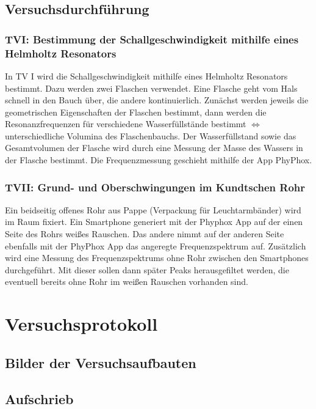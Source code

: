\documentclass{report}
\begin{document}
\subsection{Versuchsdurchführung}
\subsubsection{TVI: Bestimmung der Schallgeschwindigkeit mithilfe eines Helmholtz Resonators}
In TV I wird die Schallgeschwindigkeit mithilfe eines Helmholtz Resonators bestimmt. Dazu werden zwei Flaschen verwendet. Eine Flasche geht vom Hals schnell in den Bauch über, die andere kontinuierlich.
Zunächst werden jeweils die geometrischen Eigenschaften der Flaschen bestimmt, dann werden die Resonanzfrequenzen für verschiedene Wasserfüllstände bestimmt $\Leftrightarrow$ unterschiedliche Volumina des Flaschenbauchs.
Der Wasserfüllstand sowie das Gesamtvolumen der Flasche wird durch eine Messung der Masse des Wassers in der Flasche bestimmt. Die Frequenzmessung geschieht mithilfe der App PhyPhox. 


\subsubsection{TVII: Grund- und Oberschwingungen im Kundtschen Rohr}
Ein beidseitig offenes Rohr aus Pappe (Verpackung für Leuchtarmbänder) wird im Raum fixiert. Ein Smartphone generiert mit der Phyphox App auf der einen Seite des Rohrs weißes Rauschen. Das andere
nimmt auf der anderen Seite ebenfalls mit der PhyPhox App das angeregte Frequenzspektrum auf. Zusätzlich wird eine Messung des Frequenzspektrums ohne Rohr zwischen den Smartphones durchgeführt.
Mit dieser sollen dann später Peaks herausgefiltet werden, die eventuell bereits ohne Rohr im weißen Rauschen vorhanden sind.


\newpage
\section{Versuchsprotokoll}
\subsection{Bilder der Versuchsaufbauten}

\subsection{Aufschrieb}

\end{document}
